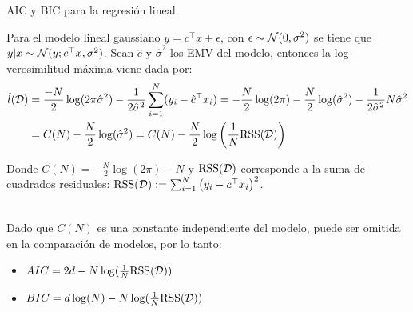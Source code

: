 \documentclass[handout, 9pt]{beamer}
\begin{document}
\begin{frame}{AIC y BIC para la regresión lineal}

Para el modelo lineal gaussiano $ y = c^\top x + \epsilon$, con $\epsilon\sim{\mathcal N}(0,\sigma^2)$ se tiene que $y|x \sim {\mathcal N}(y;c^\top x,\sigma^2)$. Sean $\hat{c}$ y $\hat{\sigma}^2$ los EMV del modelo, entonces la log-verosimilitud máxima viene dada por:
\begin{align*}
	\hat{l}({\mathcal D}) &= \frac{-N}{2}\log(2\pi\hat{\sigma}^2) - \frac{1}{2\hat{\sigma}^2} \sum_{i=1}^N( y_i-\hat{c}^\top x_i)= -\frac{N}{2}\log(2\pi) - \frac{N}{2}\log(\hat{\sigma}^2) - \frac{1}{2\hat{\sigma}^2}  N\hat{\sigma}^2\\
	&= C(N) - \frac{N}{2}\log(\hat{\sigma}^2) = C(N)- \frac{N}{2}\log\left(\frac{1}{N}\text{RSS}({\mathcal D})\right)
\end{align*} 

Donde $C(N) = -\frac{N}{2}\log(2\pi) - N$ y $\text{RSS}({\mathcal D})$ corresponde a la suma de cuadrados residuales: $\text{RSS}({\mathcal D}) := \sum_{i=1}^N \left(y_i - c^\top x_i\right)^2$.\\~\ \pause

Dado que $C(N)$ es una constante independiente del modelo, puede ser omitida en la comparación de modelos, por lo tanto:

\begin{itemize}
	\item $AIC=2d-N\log(\frac{1}{N}\text{RSS}({\mathcal D}))$
	\item $BIC = d\log(N) - N\log(\frac{1}{N}\text{RSS}({\mathcal D}))$
\end{itemize}
	
\end{frame}
\end{document}
